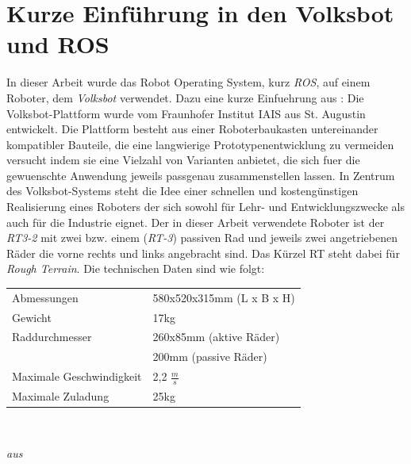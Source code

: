 \documentclass[11pt,a4paper]{article}
\begin{document}
\section{Kurze Einführung in den Volksbot und ROS}
In dieser Arbeit wurde das Robot Operating System, kurz \textit{ROS}, auf einem Roboter, dem \textit{Volksbot} verwendet. Dazu eine kurze Einfuehrung aus \cite{paper:volksbot}: Die Volksbot-Plattform wurde vom Fraunhofer Institut IAIS aus St. Augustin entwickelt.
Die Plattform besteht aus einer Roboterbaukasten untereinander kompatibler Bauteile, die eine langwierige Prototypenentwicklung zu vermeiden versucht indem sie eine Vielzahl von Varianten anbietet, die sich fuer die
gewuenschte Anwendung jeweils passgenau zusammenstellen lassen. In Zentrum des Volksbot-Systems steht die Idee einer schnellen und kostengünstigen Realisierung eines Roboters der sich sowohl für Lehr- und Entwicklungszwecke als auch
für die Industrie eignet. 
Der in dieser Arbeit verwendete Roboter ist der \textit{RT3-2} mit zwei bzw. einem (\textit{RT-3}) passiven Rad und jeweils zwei angetriebenen Räder die vorne rechts und links angebracht sind.
Das Kürzel RT steht dabei für \textit{Rough Terrain}. 
Die technischen Daten sind wie folgt:\\
\vspace{-5mm}
\begin{center}
\begin{tabular}{| p{5cm} p{5cm} |}
  \hline
  Abmessungen & 580x520x315mm (L x B x H) \\
  Gewicht & 17kg \\
  
  Raddurchmesser & 260x85mm (aktive Räder) \\
   & 200mm (passive Räder) \\
  Maximale Geschwindigkeit & 2,2 $\frac{m}{s}$ \\
  
  Maximale Zuladung & 25kg \\
  \hline
\end{tabular} \\
\end{center}

\textit{ aus} \cite{website:volksbot} \\
\end{document}
